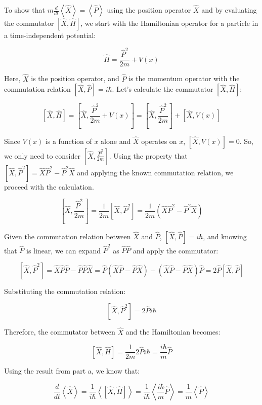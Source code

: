 \documentclass[a4paper,11pt]{article}
\begin{document}
To show that \(m\frac{d}{dt}\left<\hat{X}\right> = \left<\hat{P}\right>\) using the position operator \(\hat{X}\) and by evaluating the commutator \(\left[ \hat{X}, \hat{H}\right]\), we start with the Hamiltonian operator for a particle in a time-independent potential:

\[
\hat{H} = \frac{\hat{P}^2}{2m} + V(x)
\]

Here, \(\hat{X}\) is the position operator, and \(\hat{P}\) is the momentum operator with the commutation relation \(\left[\hat{X}, \hat{P}\right] = i\hbar\). Let's calculate the commutator \(\left[ \hat{X}, \hat{H}\right]\):

\[
\left[ \hat{X}, \hat{H}\right] = \left[ \hat{X}, \frac{\hat{P}^2}{2m} + V(x)\right] = \left[ \hat{X}, \frac{\hat{P}^2}{2m}\right] + \left[ \hat{X}, V(x)\right]
\]

Since \(V(x)\) is a function of \(x\) alone and \(\hat{X}\) operates on \(x\), \(\left[ \hat{X}, V(x)\right] = 0\). So, we only need to consider \(\left[ \hat{X}, \frac{\hat{P}^2}{2m}\right]\). Using the property that \(\left[\hat{X}, \hat{P}^2\right] = \hat{X}\hat{P}^2 - \hat{P}^2\hat{X}\) and applying the known commutation relation, we proceed with the calculation.

\[
\left[ \hat{X}, \frac{\hat{P}^2}{2m}\right] = \frac{1}{2m}\left[ \hat{X}, \hat{P}^2\right] = \frac{1}{2m}\left( \hat{X}\hat{P}^2 - \hat{P}^2\hat{X} \right)
\]

Given the commutation relation between \(\hat{X}\) and \(\hat{P}\), \(\left[ \hat{X}, \hat{P} \right] = i\hbar\), and knowing that \(\hat{P}\) is linear, we can expand \(\hat{P}^2\) as \(\hat{P}\hat{P}\) and apply the commutator:

\[
\left[ \hat{X}, \hat{P}^2\right] = \hat{X}\hat{P}\hat{P} - \hat{P}\hat{P}\hat{X} = \hat{P}\left( \hat{X}\hat{P} - \hat{P}\hat{X} \right) + \left( \hat{X}\hat{P} - \hat{P}\hat{X} \right)\hat{P} = 2\hat{P}\left[ \hat{X}, \hat{P} \right]
\]

Substituting the commutation relation:

\[
\left[ \hat{X}, \hat{P}^2\right] = 2\hat{P}i\hbar
\]

Therefore, the commutator between \(\hat{X}\) and the Hamiltonian becomes:

\[
\left[ \hat{X}, \hat{H}\right] = \frac{1}{2m}2\hat{P}i\hbar = \frac{i\hbar}{m}\hat{P}
\]

Using the result from part a, we know that:

\[
\frac{d}{dt}\left<\hat{X}\right> = \frac{1}{i\hbar}\left< \left[ \hat{X}, \hat{H} \right] \right> = \frac{1}{i\hbar}\left< \frac{i\hbar}{m}\hat{P} \right> = \frac{1}{m}\left<\hat{P}\right>
\]
\end{document}
